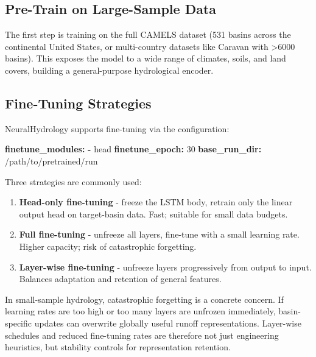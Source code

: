 \documentclass[
]{krantz}
\newenvironment{Shaded}{\begin{snugshade}}{\end{snugshade}}
\newcommand{\AttributeTok}[1]{\textcolor[rgb]{0.13,0.29,0.53}{#1}}
\newcommand{\DecValTok}[1]{\textcolor[rgb]{0.00,0.00,0.81}{#1}}
\newcommand{\FunctionTok}[1]{\textcolor[rgb]{0.13,0.29,0.53}{\textbf{#1}}}
\newcommand{\KeywordTok}[1]{\textcolor[rgb]{0.13,0.29,0.53}{\textbf{#1}}}
\providecommand{\tightlist}{%
  \setlength{\itemsep}{0pt}\setlength{\parskip}{0pt}}
\begin{document}
\subsection{Pre-Train on Large-Sample Data}\label{nh-pretrain}

The first step is training on the full CAMELS dataset (531 basins across the
continental United States, or multi-country datasets like Caravan \citep{kratzert2023caravan}
with \textgreater6000 basins). This exposes the model to a wide range of climates, soils, and
land covers, building a general-purpose hydrological encoder.

\subsection{Fine-Tuning Strategies}\label{nh-finetune}

NeuralHydrology supports fine-tuning via the configuration:

\begin{Shaded}
\begin{Highlighting}[]
\FunctionTok{finetune\_modules}\KeywordTok{:}
\AttributeTok{  }\KeywordTok{{-}}\AttributeTok{ head}
\FunctionTok{finetune\_epoch}\KeywordTok{:}\AttributeTok{ }\DecValTok{30}
\FunctionTok{base\_run\_dir}\KeywordTok{:}\AttributeTok{ /path/to/pretrained/run}
\end{Highlighting}
\end{Shaded}

Three strategies are commonly used:

\begin{enumerate}
\def\labelenumi{\arabic{enumi}.}
\tightlist
\item
  \textbf{Head-only fine-tuning} - freeze the LSTM body, retrain only the linear output head on target-basin data. Fast; suitable for small data budgets.
\item
  \textbf{Full fine-tuning} - unfreeze all layers, fine-tune with a small learning rate. Higher capacity; risk of catastrophic forgetting.
\item
  \textbf{Layer-wise fine-tuning} - unfreeze layers progressively from output to input. Balances adaptation and retention of general features.
\end{enumerate}

In small-sample hydrology, catastrophic forgetting is a concrete concern. If learning
rates are too high or too many layers are unfrozen immediately, basin-specific updates
can overwrite globally useful runoff representations. Layer-wise schedules and reduced
fine-tuning rates are therefore not just engineering heuristics, but stability controls
for representation retention.
\end{document}
